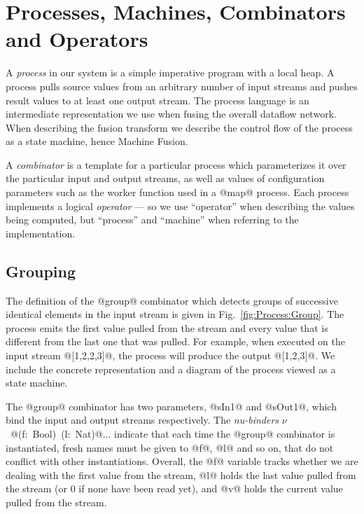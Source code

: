 
\chapter{Processes, Machines, Combinators and Operators}
\label{s:Processes}

A \emph{process} in our system is a simple imperative program with a local heap. A process pulls source values from an arbitrary number of input streams and pushes result values to at least one output stream. The process language is an intermediate representation we use when fusing the overall dataflow network. When describing the fusion transform we describe the control flow of the process as a state machine, hence Machine Fusion. 

A \emph{combinator} is a template for a particular process which parameterizes it over the particular input and output streams, as well as values of configuration parameters such as the worker function used in a @map@ process. Each process implements a logical \emph{operator} --- so we use ``operator'' when describing the values being computed, but ``process'' and ``machine'' when referring to the implementation. 


\section{Grouping}

The definition of the @group@ combinator which detects groups of successive identical elements in the input stream is given in Fig.~\ref{fig:Process:Group}. The process emits the first value pulled from the stream and every value that is different from the last one that was pulled. For example, when executed on the input stream @[1,2,2,3]@, the process will produce the output @[1,2,3]@. We include the concrete representation and a diagram of the process viewed as a state machine.

The @group@ combinator has two parameters, @sIn1@ and @sOut1@, which bind the input and output streams respectively. The \emph{nu-binders} \mbox{$\nu$ @(f: Bool) (l: Nat)@...} indicate that each time the @group@ combinator is instantiated, fresh names must be given to @f@, @l@ and so on, that do not conflict with other instantiations. Overall, the @f@ variable tracks whether we are dealing with the first value from the stream, @l@ holds the last value pulled from the stream (or 0 if none have been read yet), and @v@ holds the current value pulled from the stream. 

